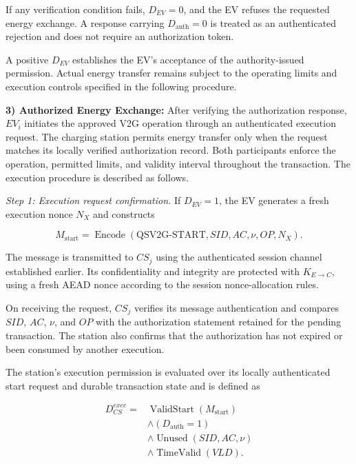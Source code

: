 \documentclass[twocolumn,10pt,journal]{IEEEtran}
\begin{document}
If any verification condition fails,
$D_{EV}=0$, and the EV refuses the
requested energy exchange. A response
carrying $D_{\mathrm{auth}}=0$ is treated
as an authenticated rejection and does not
require an authorization token.

A positive $D_{EV}$ establishes the EV's
acceptance of the authority-issued permission.
Actual energy transfer remains subject to
the operating limits and execution controls
specified in the following procedure.


\noindent\textbf{3) Authorized Energy Exchange:}
After verifying the authorization response, $EV_i$
initiates the approved V2G operation through an
authenticated execution request. The charging station
permits energy transfer only when the request matches
its locally verified authorization record. Both
participants enforce the operation, permitted limits,
and validity interval throughout the transaction.
The execution procedure is described as follows.

\textit{Step 1: Execution request confirmation.}
If $D_{EV}=1$, the EV generates a fresh execution
nonce $N_X$ and constructs

\begin{equation}
M_{\mathrm{start}} =
\operatorname{Encode}
\left(
\mathrm{QSV2G\mbox{-}START},
SID,AC,\nu,OP,N_X
\right).
\label{eq:qsv2g_execution_request}
\end{equation}

The message is transmitted to $CS_j$ using the
authenticated session channel established earlier.
Its confidentiality and integrity are protected
with $K_{E\to C}$, using a fresh AEAD nonce
according to the session nonce-allocation rules.

On receiving the request, $CS_j$ verifies its
message authentication and compares $SID$, $AC$,
$\nu$, and $OP$ with the authorization statement
retained for the pending transaction. The station
also confirms that the authorization has not
expired or been consumed by another execution.

The station's execution permission is evaluated over its
locally authenticated start request and durable transaction state
and is defined as

\begin{equation}
\begin{aligned}
D_{CS}^{exec}={}&
\operatorname{ValidStart}(M_{\mathrm{start}})\\
&\land(D_{\mathrm{auth}}=1)\\
&\land\operatorname{Unused}(SID,AC,\nu)\\
&\land\operatorname{TimeValid}(VLD).
\end{aligned}
\label{eq:qsv2g_cs_execution_decision}
\end{equation}
\end{document}
